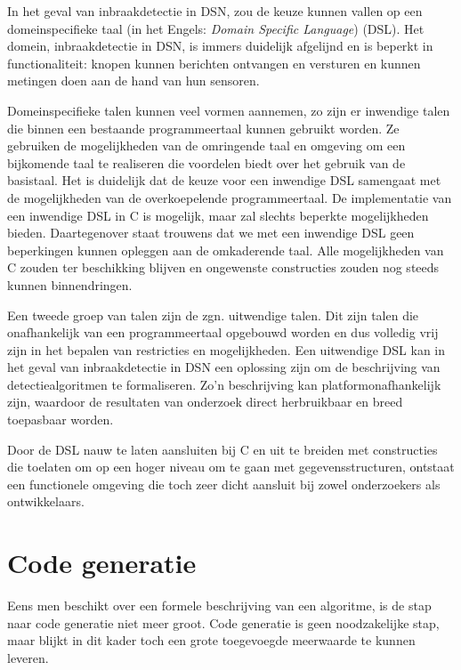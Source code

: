 In het geval van inbraakdetectie in DSN, zou de keuze kunnen vallen op een
domeinspecifieke taal (in het Engels: \emph{Domain Specific Language})
(DSL)\citep{van2000domain, mernik2005and, fowler2010domain}. Het domein,
inbraakdetectie in DSN, is immers duidelijk afgelijnd en is beperkt in
functionaliteit: knopen kunnen berichten ontvangen en versturen en kunnen
metingen doen aan de hand van hun sensoren.

Domeinspecifieke talen kunnen veel vormen aannemen, zo zijn er inwendige talen
die binnen een bestaande programmeertaal kunnen gebruikt worden. Ze gebruiken
de mogelijkheden van de omringende taal en omgeving om een bijkomende taal te
realiseren die voordelen biedt over het gebruik van de basistaal. Het is
duidelijk dat de keuze voor een inwendige DSL samengaat met de mogelijkheden
van de overkoepelende programmeertaal. De implementatie van een inwendige DSL
in C is mogelijk, maar zal slechts beperkte mogelijkheden bieden. Daartegenover
staat trouwens dat we met een inwendige DSL geen beperkingen kunnen opleggen
aan de omkaderende taal. Alle mogelijkheden van C zouden ter beschikking
blijven en ongewenste constructies zouden nog steeds kunnen binnendringen.

Een tweede groep van talen zijn de zgn. uitwendige talen. Dit zijn talen die
onafhankelijk van een programmeertaal opgebouwd worden en dus volledig vrij
zijn in het bepalen van restricties en mogelijkheden. Een uitwendige DSL kan in
het geval van inbraakdetectie in DSN een oplossing zijn om de beschrijving van
detectiealgoritmen te formaliseren. Zo'n beschrijving kan platformonafhankelijk
zijn, waardoor de resultaten van onderzoek direct herbruikbaar en breed
toepasbaar worden.

Door de DSL nauw te laten aansluiten bij C en uit te breiden met constructies
die toelaten om op een hoger niveau om te gaan met gegevensstructuren, ontstaat
een functionele omgeving die toch zeer dicht aansluit bij zowel onderzoekers
als ontwikkelaars.

\section{Code generatie}
\label{section:solution-codegen}

Eens men beschikt over een formele beschrijving van een algoritme, is de stap
naar code generatie niet meer groot. Code generatie is geen noodzakelijke stap,
maar blijkt in dit kader toch een grote toegevoegde meerwaarde te kunnen
leveren.

